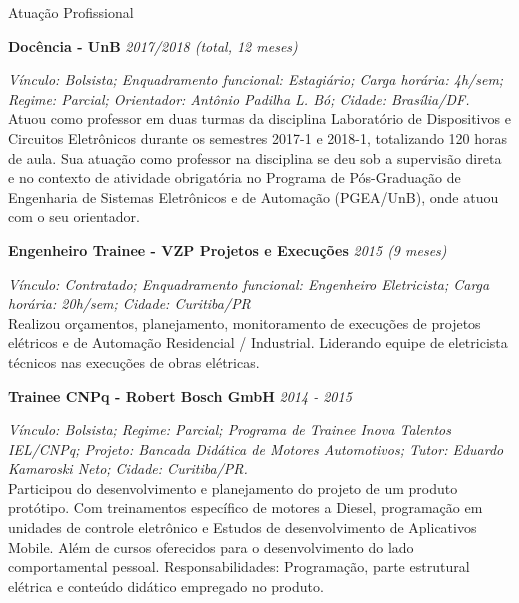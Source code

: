 \documentclass{resume} %
\begin{document}

\begin{rSection}{Atuação Profissional}



{\bf Docência - UnB} \hfill {\em 2017/2018 (total, 12 meses)}

\textit{Vínculo: Bolsista; Enquadramento funcional: Estagiário; Carga horária: 4h/sem; Regime: Parcial; Orientador: Antônio Padilha L. Bó; Cidade: Brasília/DF.}
\\Atuou como professor em duas turmas da disciplina Laboratório de Dispositivos e Circuitos Eletrônicos durante os semestres 2017-1 e 2018-1, totalizando 120 horas de aula. Sua atuação como professor na disciplina se deu sob a supervisão direta e no contexto de atividade obrigatória no Programa de Pós-Graduação de Engenharia de Sistemas Eletrônicos e de Automação (PGEA/UnB), onde atuou com o seu orientador.

{\bf Engenheiro Trainee - VZP Projetos e Execuções} \hfill {\em 2015 (9 meses)}

\textit{Vínculo: Contratado; Enquadramento funcional: Engenheiro Eletricista; Carga horária: 20h/sem; Cidade: Curitiba/PR}
\\Realizou orçamentos, planejamento, monitoramento de execuções de projetos elétricos e de Automação Residencial / Industrial. Liderando equipe de eletricista técnicos nas execuções de obras elétricas.


{\bf Trainee CNPq -  Robert Bosch GmbH} \hfill {\em 2014 - 2015}

\textit{Vínculo: Bolsista; Regime: Parcial; Programa de Trainee Inova Talentos IEL/CNPq; Projeto: Bancada Didática de Motores Automotivos; Tutor: Eduardo Kamaroski Neto; Cidade: Curitiba/PR.}
\\Participou do desenvolvimento e planejamento do projeto de um produto protótipo. Com treinamentos específico de motores a Diesel, programação em unidades de controle eletrônico e Estudos de desenvolvimento de Aplicativos Mobile. Além de cursos oferecidos para o desenvolvimento do lado comportamental pessoal. Responsabilidades: Programação, parte estrutural elétrica e conteúdo didático empregado no produto. 



\end{rSection}
\end{document}

